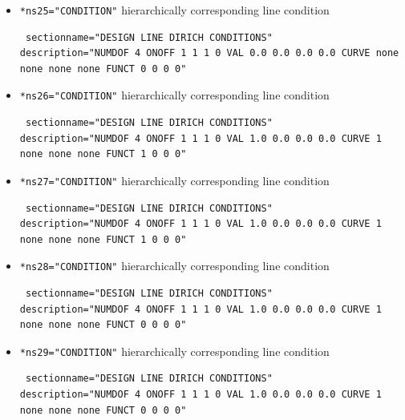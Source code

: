 \begin{itemize}
\item \verb|*ns25="CONDITION"| \qquad hierarchically corresponding line condition
\begin{small} \begin{verbatim} sectionname="DESIGN LINE DIRICH CONDITIONS"
description="NUMDOF 4 ONOFF 1 1 1 0 VAL 0.0 0.0 0.0 0.0 CURVE none none none none FUNCT 0 0 0 0"
\end{verbatim} \end{small}

 \item \verb|*ns26="CONDITION"| \qquad hierarchically corresponding line condition
\begin{small} \begin{verbatim} sectionname="DESIGN LINE DIRICH CONDITIONS"
description="NUMDOF 4 ONOFF 1 1 1 0 VAL 1.0 0.0 0.0 0.0 CURVE 1 none none none FUNCT 1 0 0 0"
\end{verbatim} \end{small}

 \item \verb|*ns27="CONDITION"| \qquad hierarchically corresponding line condition
\begin{small} \begin{verbatim} sectionname="DESIGN LINE DIRICH CONDITIONS"
description="NUMDOF 4 ONOFF 1 1 1 0 VAL 1.0 0.0 0.0 0.0 CURVE 1 none none none FUNCT 1 0 0 0"
\end{verbatim} \end{small}

 \item \verb|*ns28="CONDITION"| \qquad hierarchically corresponding line condition
\begin{small} \begin{verbatim} sectionname="DESIGN LINE DIRICH CONDITIONS"
description="NUMDOF 4 ONOFF 1 1 1 0 VAL 1.0 0.0 0.0 0.0 CURVE 1 none none none FUNCT 0 0 0 0"
\end{verbatim} \end{small}

 \item \verb|*ns29="CONDITION"| \qquad hierarchically corresponding line condition
\begin{small} \begin{verbatim} sectionname="DESIGN LINE DIRICH CONDITIONS"
description="NUMDOF 4 ONOFF 1 1 1 0 VAL 1.0 0.0 0.0 0.0 CURVE 1 none none none FUNCT 0 0 0 0"
\end{verbatim} \end{small}


\end{itemize}
